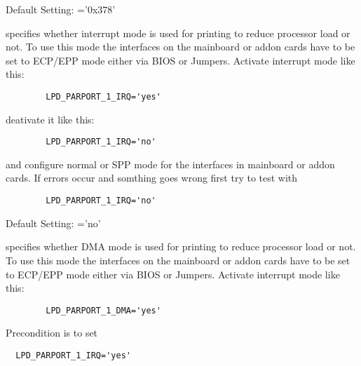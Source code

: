 \begin{description}
  Default Setting: ='0x378'



  { specifies whether interrupt mode is used
  for printing to reduce processor load or not. To use this mode the
  interfaces on the mainboard or addon cards have to be set to ECP/EPP
  mode either via BIOS or Jumpers. Activate interrupt mode like this:

\begin{example}
\begin{verbatim}
        LPD_PARPORT_1_IRQ='yes'
\end{verbatim}
\end{example}

  deativate it like this:

\begin{example}
\begin{verbatim}
        LPD_PARPORT_1_IRQ='no'
\end{verbatim}
\end{example}

  and configure normal or SPP mode for the interfaces in mainboard or addon
  cards. If errors occur and somthing goes wrong first try to test with

\begin{example}
\begin{verbatim}
        LPD_PARPORT_1_IRQ='no'
\end{verbatim}
\end{example}

  Default Setting: ='no'}



  { specifies whether DMA mode is used
  for printing to reduce processor load or not. To use this mode the
  interfaces on the mainboard or addon cards have to be set to ECP/EPP
  mode either via BIOS or Jumpers. Activate interrupt mode like this:

\begin{example}
\begin{verbatim}
        LPD_PARPORT_1_DMA='yes'
\end{verbatim}
\end{example}

  Precondition is to set

\begin{example}
\begin{verbatim}
  LPD_PARPORT_1_IRQ='yes'
\end{verbatim}
\end{example}

}
\end{description}
